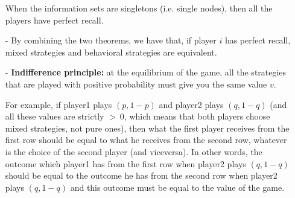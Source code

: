 \begin{itemize}
		\noindent When the information sets are singletons (i.e. 
		single nodes), then all the players have perfect recall.
	\item[-] By combining the two theorems, we have that, if player $i$ 
		has perfect recall, mixed strategies and behavioral 
		strategies are equivalent.
	\item[-] \textbf{Indifference principle:} at the equilibrium of the 
		game, all the strategies that are played with positive 
		probability must give you the same value $v$.

		\noindent For example, if player1 plays $\left(p,1-p\right)$ 
		and player2 plays $\left(q,1-q\right)$ (and all these 
		values are strictly $>~0$, which means that both players 
		choose mixed strategies, not pure ones), then what the first 
		player receives from the first row should be equal to what he 
		receives from the second row, whatever is the choice of the 
		second player (and viceversa). In other words, the outcome 
		which player1 has from the first row when player2 plays 
		$\left(q,1-q\right)$ should be equal to the outcome he has 
		from the second row when player2 plays $\left(q,1-q\right)$ 
		and this outcome must be equal to the value of the game.
\end{itemize}

%
